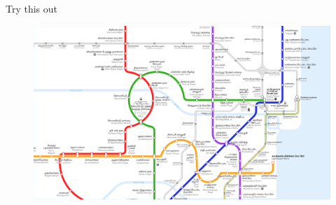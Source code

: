 \documentclass[mathserif]{beamer}
\begin{document}
\begin{frame}{Try this out}
    \begin{figure}
        \centering
        \includegraphics[width=\textwidth]{metromap_cropped.pdf}
    \end{figure}
\end{frame}
\end{document}
